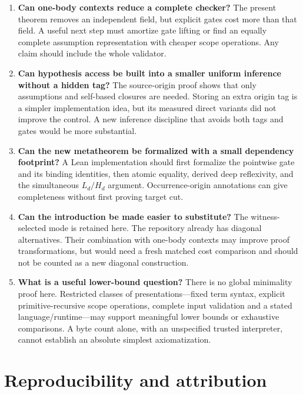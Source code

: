 \documentclass[11pt]{article}
\theoremstyle{definition}
\theoremstyle{remark}
\begin{document}
\begin{enumerate}
\item \textbf{Can one-body contexts reduce a complete checker?}
The present theorem removes an independent field, but explicit gates
cost more than that field. A useful next step must amortize gate lifting
or find an equally complete assumption representation with cheaper
scope operations. Any claim should include the whole validator.

\item \textbf{Can hypothesis access be built into a smaller uniform
inference without a hidden tag?}
The source-origin proof shows that only assumptions and self-based
closures are needed. Storing an extra origin tag is a simpler
implementation idea, but its measured direct variants did not improve
the control. A new inference discipline that avoids both tags and gates
would be more substantial.

\item \textbf{Can the new metatheorem be formalized with a small
dependency footprint?}
A Lean implementation should first formalize the pointwise gate and its
binding identities, then atomic equality, derived deep reflexivity, and
the simultaneous $L_d/H_d$ argument. Occurrence-origin annotations can
give completeness without first proving target cut.

\item \textbf{Can the introduction be made easier to substitute?}
The witness-selected mode is retained here. The repository already has
diagonal alternatives. Their combination with one-body contexts may
improve proof transformations, but would need a fresh matched cost
comparison and should not be counted as a new diagonal construction.

\item \textbf{What is a useful lower-bound question?}
There is no global minimality proof here. Restricted classes of
presentations---fixed term syntax, explicit primitive-recursive scope
operations, complete input validation and a stated language/runtime---may
support meaningful lower bounds or exhaustive comparisons. A byte count
alone, with an unspecified trusted interpreter, cannot establish an
absolute simplest axiomatization.
\end{enumerate}

\section*{Reproducibility and attribution}
\end{document}
